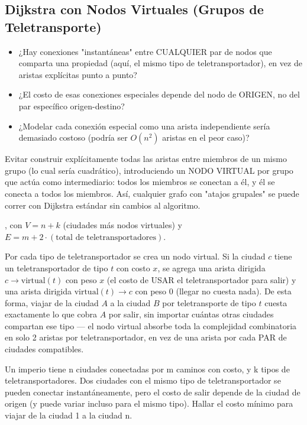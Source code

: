 \subsection{Dijkstra con Nodos Virtuales (Grupos de Teletransporte)}


\begin{itemize}
\item ¿Hay conexiones "instantáneas" entre CUALQUIER par de nodos que comparta una propiedad (aquí, el mismo tipo de teletransportador), en vez de aristas explícitas punto a punto?
\item ¿El costo de esas conexiones especiales depende del nodo de ORIGEN, no del par específico origen-destino?
\item ¿Modelar cada conexión especial como una arista independiente sería demasiado costoso (podría ser $O(n^2)$ aristas en el peor caso)?
\end{itemize}

 Evitar construir explícitamente todas las aristas entre miembros de un mismo grupo (lo cual sería cuadrático), introduciendo un NODO VIRTUAL por grupo que actúa como intermediario: todos los miembros se conectan a él, y él se conecta a todos los miembros. Así, cualquier grafo con "atajos grupales" se puede correr con Dijkstra estándar sin cambios al algoritmo.

 , con $V = n + k$ (ciudades más nodos virtuales) y $E = m + 2 \cdot (\text{total de teletransportadores})$.

 Por cada tipo de teletransportador se crea un nodo virtual. Si la ciudad $c$ tiene un teletransportador de tipo $t$ con costo $x$, se agrega una arista dirigida $c \to \text{virtual}(t)$ con peso $x$ (el costo de USAR el teletransportador para salir) y una arista dirigida $\text{virtual}(t) \to c$ con peso 0 (llegar no cuesta nada). De esta forma, viajar de la ciudad $A$ a la ciudad $B$ por teletransporte de tipo $t$ cuesta exactamente lo que cobra $A$ por salir, sin importar cuántas otras ciudades compartan ese tipo — el nodo virtual absorbe toda la complejidad combinatoria en solo 2 aristas por teletransportador, en vez de una arista por cada PAR de ciudades compatibles.


Un imperio tiene n ciudades conectadas por m caminos con costo, y k tipos de teletransportadores. Dos ciudades con el mismo tipo de teletransportador se pueden conectar instantáneamente, pero el costo de salir depende de la ciudad de origen (y puede variar incluso para el mismo tipo). Hallar el costo mínimo para viajar de la ciudad 1 a la ciudad n.

